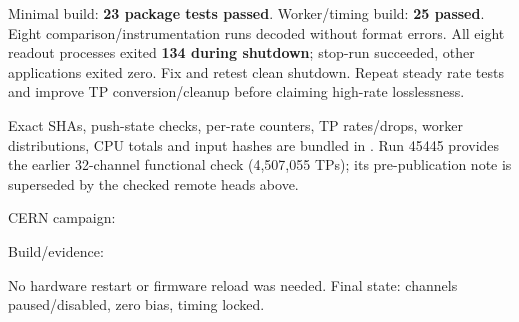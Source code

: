 \documentclass[10pt,a4paper]{article}
\newcommand{\heading}[1]{\par\vspace{5pt}{\large\bfseries #1}\par\vspace{2pt}}
\newcommand{\code}[1]{\texttt{\detokenize{#1}}}
\begin{document}
\heading{Validation, open work and evidence}
Minimal build: \textbf{23 package tests passed}. Worker/timing build: \textbf{25 passed}. Eight comparison/instrumentation runs decoded without format errors. All eight readout processes exited \textbf{134 during shutdown}; stop-run succeeded, other applications exited zero. Fix and retest clean shutdown. Repeat steady rate tests and improve TP conversion/cleanup before claiming high-rate losslessness.

{\footnotesize
Exact SHAs, push-state checks, per-rate counters, TP rates/drops, worker distributions, CPU totals and input hashes are bundled in \code{evidence/}. Run 45445 provides the earlier 32-channel functional check (4,507,055 TPs); its pre-publication note is superseded by the checked remote heads above.\par
CERN campaign: \par
Build/evidence: \par
No hardware restart or firmware reload was needed. Final state: channels paused/disabled, zero bias, timing locked.}
\end{document}

